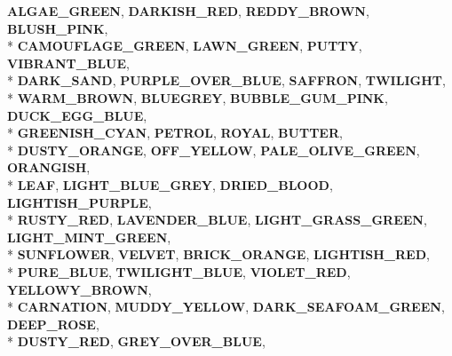 \begin{DoxyCompactItemize}
{\bfseries A\+L\+G\+A\+E\+\_\+\+G\+R\+E\+EN}, 
{\bfseries D\+A\+R\+K\+I\+S\+H\+\_\+\+R\+ED}, 
{\bfseries R\+E\+D\+D\+Y\+\_\+\+B\+R\+O\+WN}, 
{\bfseries B\+L\+U\+S\+H\+\_\+\+P\+I\+NK}, 
\\*
{\bfseries C\+A\+M\+O\+U\+F\+L\+A\+G\+E\+\_\+\+G\+R\+E\+EN}, 
{\bfseries L\+A\+W\+N\+\_\+\+G\+R\+E\+EN}, 
{\bfseries P\+U\+T\+TY}, 
{\bfseries V\+I\+B\+R\+A\+N\+T\+\_\+\+B\+L\+UE}, 
\\*
{\bfseries D\+A\+R\+K\+\_\+\+S\+A\+ND}, 
{\bfseries P\+U\+R\+P\+L\+E\+\_\+\+O\+V\+E\+R\+\_\+\+B\+L\+UE}, 
{\bfseries S\+A\+F\+F\+R\+ON}, 
{\bfseries T\+W\+I\+L\+I\+G\+HT}, 
\\*
{\bfseries W\+A\+R\+M\+\_\+\+B\+R\+O\+WN}, 
{\bfseries B\+L\+U\+E\+G\+R\+EY}, 
{\bfseries B\+U\+B\+B\+L\+E\+\_\+\+G\+U\+M\+\_\+\+P\+I\+NK}, 
{\bfseries D\+U\+C\+K\+\_\+\+E\+G\+G\+\_\+\+B\+L\+UE}, 
\\*
{\bfseries G\+R\+E\+E\+N\+I\+S\+H\+\_\+\+C\+Y\+AN}, 
{\bfseries P\+E\+T\+R\+OL}, 
{\bfseries R\+O\+Y\+AL}, 
{\bfseries B\+U\+T\+T\+ER}, 
\\*
{\bfseries D\+U\+S\+T\+Y\+\_\+\+O\+R\+A\+N\+GE}, 
{\bfseries O\+F\+F\+\_\+\+Y\+E\+L\+L\+OW}, 
{\bfseries P\+A\+L\+E\+\_\+\+O\+L\+I\+V\+E\+\_\+\+G\+R\+E\+EN}, 
{\bfseries O\+R\+A\+N\+G\+I\+SH}, 
\\*
{\bfseries L\+E\+AF}, 
{\bfseries L\+I\+G\+H\+T\+\_\+\+B\+L\+U\+E\+\_\+\+G\+R\+EY}, 
{\bfseries D\+R\+I\+E\+D\+\_\+\+B\+L\+O\+OD}, 
{\bfseries L\+I\+G\+H\+T\+I\+S\+H\+\_\+\+P\+U\+R\+P\+LE}, 
\\*
{\bfseries R\+U\+S\+T\+Y\+\_\+\+R\+ED}, 
{\bfseries L\+A\+V\+E\+N\+D\+E\+R\+\_\+\+B\+L\+UE}, 
{\bfseries L\+I\+G\+H\+T\+\_\+\+G\+R\+A\+S\+S\+\_\+\+G\+R\+E\+EN}, 
{\bfseries L\+I\+G\+H\+T\+\_\+\+M\+I\+N\+T\+\_\+\+G\+R\+E\+EN}, 
\\*
{\bfseries S\+U\+N\+F\+L\+O\+W\+ER}, 
{\bfseries V\+E\+L\+V\+ET}, 
{\bfseries B\+R\+I\+C\+K\+\_\+\+O\+R\+A\+N\+GE}, 
{\bfseries L\+I\+G\+H\+T\+I\+S\+H\+\_\+\+R\+ED}, 
\\*
{\bfseries P\+U\+R\+E\+\_\+\+B\+L\+UE}, 
{\bfseries T\+W\+I\+L\+I\+G\+H\+T\+\_\+\+B\+L\+UE}, 
{\bfseries V\+I\+O\+L\+E\+T\+\_\+\+R\+ED}, 
{\bfseries Y\+E\+L\+L\+O\+W\+Y\+\_\+\+B\+R\+O\+WN}, 
\\*
{\bfseries C\+A\+R\+N\+A\+T\+I\+ON}, 
{\bfseries M\+U\+D\+D\+Y\+\_\+\+Y\+E\+L\+L\+OW}, 
{\bfseries D\+A\+R\+K\+\_\+\+S\+E\+A\+F\+O\+A\+M\+\_\+\+G\+R\+E\+EN}, 
{\bfseries D\+E\+E\+P\+\_\+\+R\+O\+SE}, 
\\*
{\bfseries D\+U\+S\+T\+Y\+\_\+\+R\+ED}, 
{\bfseries G\+R\+E\+Y\+\_\+\+O\+V\+E\+R\+\_\+\+B\+L\+UE}, 

\end{DoxyCompactItemize}
